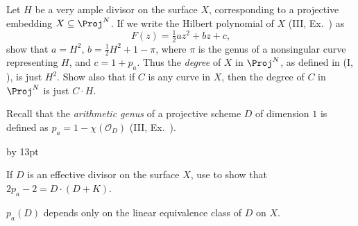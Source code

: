 {{\smallskip
\noindent\hypertarget{ex-V-1.2}{}Let $H$ be a very ample divisor on the surface $X$, corresponding to a projective embedding $X\subseteq\Proj^N$. If we write the Hilbert polynomial of $X$ (III, Ex.~) as
\[
F(z)=\tfrac12az^2+bz+c,
\]
show that $a=H^2$, $b=\tfrac12H^2+1-\pi$, where $\pi$ is the genus of a nonsingular curve representing $H$, and $c=1+p_a$. Thus the \emph{degree} of $X$ in $\Proj^N$, as defined in (I, ), is just $H^2$. Show also that if $C$ is any curve in $X$, then the degree of $C$ in $\Proj^N$ is just $C\cdot H$.

\smallskip
\noindent\hypertarget{ex-V-1.3}{}Recall that the \emph{arithmetic genus} of a projective scheme $D$ of dimension $1$ is defined as $p_a=1-\chi(\mathcal O_D)$ (III, Ex.~).
{\advance\leftskip by 13pt\par
\noindent\hypertarget{ex-V-1.3a}{}If $D$ is an effective divisor on the surface $X$, use  to show that $2p_a-2=D\cdot(D+K)$.

\noindent\hypertarget{ex-V-1.3b}{}$p_a(D)$ depends only on the linear equivalence class of $D$ on $X$.\par}\par}
}
